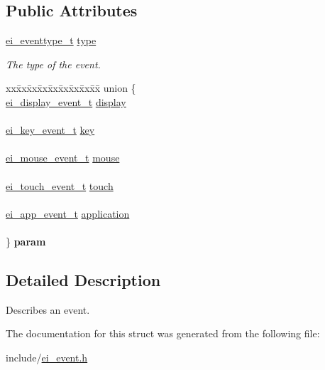 \subsection*{Public Attributes}
\begin{DoxyCompactItemize}
\item 
\hyperlink{ei__event_8h_a132dde064150d861ad24e9d839cbe007}{ei\+\_\+eventtype\+\_\+t} \hyperlink{structei__event__t_aee18f11986ed603959de628558812c58}{type}\hypertarget{structei__event__t_aee18f11986ed603959de628558812c58}{}\label{structei__event__t_aee18f11986ed603959de628558812c58}

\begin{DoxyCompactList}\small\item\em The type of the event. \end{DoxyCompactList}\item 
\begin{tabbing}
xx\=xx\=xx\=xx\=xx\=xx\=xx\=xx\=xx\=\kill
union \{\\
\>\hyperlink{structei__display__event__t}{ei\_display\_event\_t} \hyperlink{structei__event__t_aa0c523780572b4ea92fb3f9a016f6c04}{display}\\
\>\\
\>\hyperlink{structei__key__event__t}{ei\_key\_event\_t} \hyperlink{structei__event__t_a0f146bb41b78f27e18ecccc71f50026d}{key}\\
\>\\
\>\hyperlink{structei__mouse__event__t}{ei\_mouse\_event\_t} \hyperlink{structei__event__t_a7f0b0d0cf765a822aca7a435510d9d85}{mouse}\\
\>\\
\>\hyperlink{structei__touch__event__t}{ei\_touch\_event\_t} \hyperlink{structei__event__t_a8f3c33a53f2738bd153c923b3a6ad20d}{touch}\\
\>\\
\>\hyperlink{structei__app__event__t}{ei\_app\_event\_t} \hyperlink{structei__event__t_ab93b7dc04597613a3bd0195e74a9f7bb}{application}\\
\>\\
\} {\bfseries param}\hypertarget{structei__event__t_a03a01773dff790d4b772f6b16e4fbb4b}{}\label{structei__event__t_a03a01773dff790d4b772f6b16e4fbb4b}
\\

\end{tabbing}\end{DoxyCompactItemize}


\subsection{Detailed Description}
Describes an event. 

The documentation for this struct was generated from the following file\+:\begin{DoxyCompactItemize}
\item 
include/\hyperlink{ei__event_8h}{ei\+\_\+event.\+h}\end{DoxyCompactItemize}

